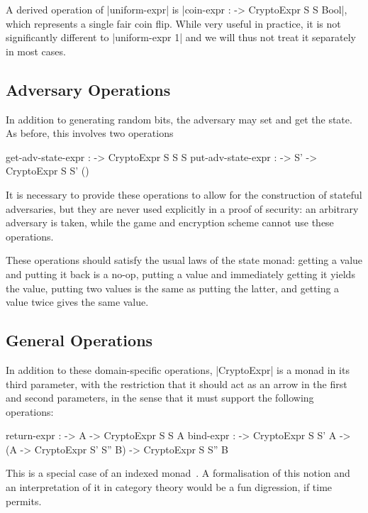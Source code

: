 A derived operation of |uniform-expr| is |coin-expr :  -> CryptoExpr S S Bool|, which represents a single
fair coin flip.  While very useful in practice, it is not significantly different to |uniform-expr 1| and we will thus
not treat it separately in most cases.

\subsection{Adversary Operations}

In addition to generating random bits, the adversary may set and get the state.  As before, this involves two operations
\begin{code}
    get-adv-state-expr :  -> CryptoExpr S S S
    put-adv-state-expr :  -> S' -> CryptoExpr S S' ()
\end{code}

It is necessary to provide these operations to allow for the construction of stateful adversaries, but they are never
used explicitly in a proof of security: an arbitrary adversary is taken, while the game and encryption scheme cannot use
these operations.

These operations should satisfy the usual laws of the state monad: getting a value and putting it back is a no-op,
putting a value and immediately getting it yields the value, putting two values is the same as putting the latter, and
getting a value twice gives the same value.

\subsection{General Operations}

In addition to these domain-specific operations, |CryptoExpr| is a monad in its third parameter, with the restriction
that it should act as an arrow in the first and second parameters, in the sense that it must support the following
operations:
\begin{code}
    return-expr :  -> A -> CryptoExpr S S A
    bind-expr :  -> CryptoExpr S S' A
              -> (A -> CryptoExpr S' S'' B)
              -> CryptoExpr S S'' B
\end{code}

This is a special case of an indexed monad~\cite{indexedmonads}.  A formalisation of this notion and an interpretation
of it in category theory would be a fun digression, if time permits.

